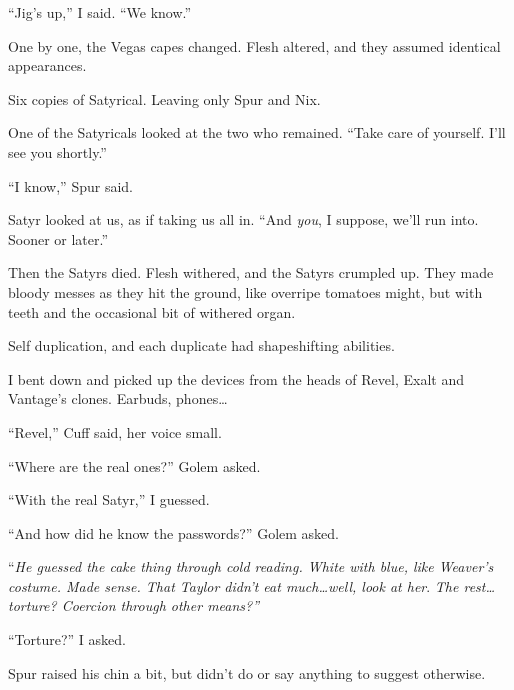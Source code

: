 ``Jig's up,'' I said.  ``We know.''



One by one, the Vegas capes changed.  Flesh altered, and they assumed identical appearances.



Six copies of Satyrical.  Leaving only Spur and Nix.



One of the Satyricals looked at the two who remained.  ``Take care of yourself.  I'll see you shortly.''



``I know,'' Spur said.



Satyr looked at us, as if taking us all in.  ``And \emph{you}, I suppose, we'll run into.  Sooner or later.''



Then the Satyrs died.  Flesh withered, and the Satyrs crumpled up.  They made bloody messes as they hit the ground, like overripe tomatoes might, but with teeth and the occasional bit of withered organ.



Self duplication, and each duplicate had shapeshifting abilities.



I bent down and picked up the devices from the heads of Revel, Exalt and Vantage's clones.  Earbuds, phones\ldots



``Revel,'' Cuff said, her voice small.



``Where are the real ones?'' Golem asked.



``With the real Satyr,'' I guessed.



``And how did he know the passwords?'' Golem asked.



``\emph{He guessed the cake thing through cold reading.  White with blue, like Weaver's costume.  Made sense.  That Taylor didn't eat much\ldots well, look at her}.  \emph{The rest\ldots torture?  Coercion through other means?''}



``Torture?'' I asked.



Spur raised his chin a bit, but didn't do or say anything to suggest otherwise.




